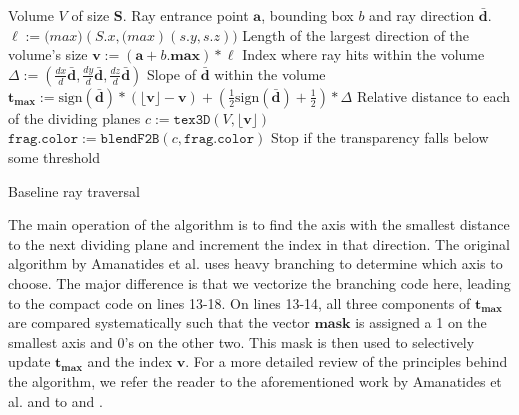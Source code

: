 \begin{algorithm}[ht!]
\begin{algorithmic}[1]
\Require Volume $V$ of size $\mathbf{S}$. 
\Require Ray entrance point $\mathbf{a}$, bounding box $b$ and ray direction $\mathbf{\bar{d}}$.
\State $\ell := \mathrm(max)( S.x, \mathrm(max)(s.y, s.z) )$
\Comment Length of the largest direction of the volume's size
\State $\mathbf{v} := (\mathbf{a} + b.\mathbf{max}) * \ell$
\Comment Index where ray hits within the volume
\State $\Delta :=(\frac{dx}{d}\mathbf{\bar{d}}, \frac{dy}{d}\mathbf{\bar{d}}, \frac{dz}{d}\mathbf{\bar{d}})$
\Comment Slope of $\mathbf{\bar{d}}$ within the volume
\State $\mathbf{t_{max}} :=\mathrm{sign}(\mathbf{\bar{d}}) * (\lfloor \mathbf{v} \rfloor - \mathbf{v}) + (\frac{1}{2}\mathrm{sign}(\mathbf{\bar{d}}) + \frac{1}{2}) * \Delta $
\Comment Relative distance to each of the dividing planes
\State {}
    \State $c := \texttt{tex3D}( V, \lfloor \mathbf{v} \rfloor )$
    \State $\texttt{frag.color} := \texttt{blendF2B}(c, \texttt{frag.color})$
    \State {}
        \Return
        \Comment Stop if the transparency falls below some threshold
    \EndIf
    \State {}
    \State {}
\EndWhile
\end{algorithmic}
\caption{Baseline ray traversal}
\label{algo:baseline}
\end{algorithm}
%
The main operation of the algorithm is to find the axis with the smallest distance to the next dividing plane and increment the index in that direction. The original algorithm by Amanatides et al. \cite{amanatides84} uses heavy branching to determine which axis to choose. The major difference is that we vectorize the branching code here, leading to the compact code on lines 13-18. On lines 13-14, all three components of $\mathbf{t_{max}}$ are compared systematically such that the vector $\mathbf{mask}$ is assigned a 1 on the smallest axis and 0's on the other two. This mask is then used to selectively update $\mathbf{t_{max}}$ and the index $\mathbf{v}$. For a more detailed review of the principles behind the algorithm, we refer the reader to the aforementioned work by Amanatides et al. and to \cite{bresenham65} and \cite{fujimoto85}.
%
